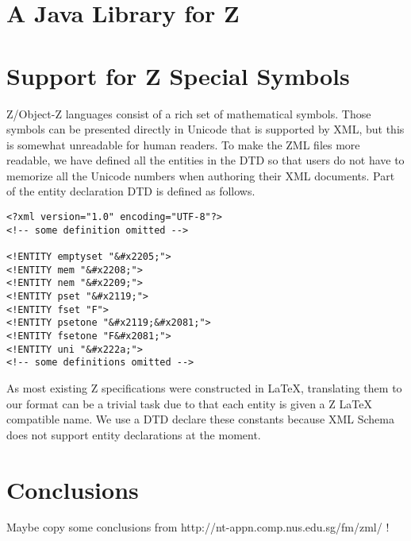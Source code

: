 



\section{A Java Library for Z}


\section{Support for Z Special Symbols}

Z/Object-Z languages consist of a rich set of mathematical symbols. Those
symbols can be presented directly in Unicode that is supported by XML,
but this is somewhat unreadable for human readers.  To make the ZML
files more readable, we have defined all the entities in the DTD so that
users do not have to memorize all the Unicode numbers when authoring their
XML documents. Part of the entity declaration DTD is defined as follows. 

\begin{verbatim} 
<?xml version="1.0" encoding="UTF-8"?>
<!-- some definition omitted -->

<!ENTITY emptyset "&#x2205;">
<!ENTITY mem "&#x2208;">
<!ENTITY nem "&#x2209;">
<!ENTITY pset "&#x2119;">
<!ENTITY fset "F">
<!ENTITY psetone "&#x2119;&#x2081;">
<!ENTITY fsetone "F&#x2081;">
<!ENTITY uni "&#x222a;">
<!-- some definitions omitted -->
\end{verbatim}

As most existing Z specifications were constructed in LaTeX, translating
them to our format can be a trivial task due to that each entity is given a
Z LaTeX compatible name.  We use a DTD declare these constants 
because XML Schema does not support entity declarations at the moment.

 
\section{Conclusions}


  Maybe copy some conclusions from http://nt-appn.comp.nus.edu.sg/fm/zml/ !

